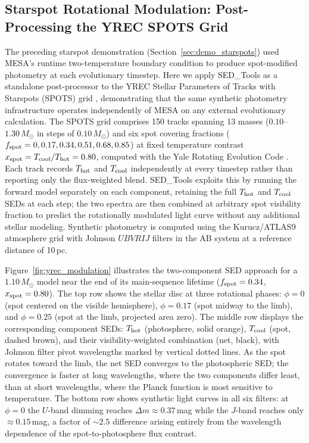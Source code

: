 \documentclass[linenumbers,apj,twocolumn, floatfix]{aastex701} \usepackage{amsmath} \usepackage{longtable} \usepackage{graphicx} \usepackage{ulem} \usepackage{xcolor} \usepackage{lettrine} \usepackage{yfonts} \usepackage{rotating}
\begin{document}
\subsection{Starspot Rotational Modulation: Post-Processing the YREC SPOTS Grid}
\label{sec:demo_yrec}

The preceding starspot demonstration (Section~\ref{sec:demo_starspots}) used MESA's runtime two-temperature boundary condition to produce spot-modified photometry at each evolutionary timestep.
Here we apply SED\_Tools as a standalone post-processor to the YREC Stellar Parameters of Tracks with Starspots (SPOTS) grid \citep{Somers2020}, demonstrating that the same synthetic photometry infrastructure operates independently of MESA on any external evolutionary calculation.
The SPOTS grid comprises 150 tracks spanning 13 masses ($0.10$--$1.30\,M_\odot$ in steps of $0.10\,M_\odot$) and six spot covering fractions ($f_{\rm spot} = 0, 0.17, 0.34, 0.51, 0.68, 0.85$) at fixed temperature contrast $x_{\rm spot} = T_{\rm cool}/T_{\rm hot} = 0.80$, computed with the Yale Rotating Evolution Code \citep{vanSaders2013}.
Each track records $T_{\rm hot}$ and $T_{\rm cool}$ independently at every timestep rather than reporting only the flux-weighted blend.
SED\_Tools exploits this by running the forward model separately on each component, retaining the full $T_{\rm hot}$ and $T_{\rm cool}$ SEDs at each step; the two spectra are then combined at arbitrary spot visibility fraction to predict the rotationally modulated light curve without any additional stellar modeling.
Synthetic photometry is computed using the Kurucz/ATLAS9 atmosphere grid with Johnson $UBVRIJ$ filters in the AB system at a reference distance of 10\,pc.

Figure~\ref{fig:yrec_modulation} illustrates the two-component SED approach for a $1.10\,M_\odot$ model near the end of its main-sequence lifetime ($f_{\rm spot} = 0.34$, $x_{\rm spot} = 0.80$).
The top row shows the stellar disc at three rotational phases: $\phi = 0$ (spot centered on the visible hemisphere), $\phi = 0.17$ (spot midway to the limb), and $\phi = 0.25$ (spot at the limb, projected area zero).
The middle row displays the corresponding component SEDs: $T_{\rm hot}$ (photosphere, solid orange), $T_{\rm cool}$ (spot, dashed brown), and their visibility-weighted combination (net, black), with Johnson filter pivot wavelengths marked by vertical dotted lines.
As the spot rotates toward the limb, the net SED converges to the photospheric SED; the convergence is faster at long wavelengths, where the two components differ least, than at short wavelengths, where the Planck function is most sensitive to temperature.
The bottom row shows synthetic light curves in all six filters: at $\phi = 0$ the $U$-band dimming reaches $\Delta m \approx 0.37$\,mag while the $J$-band reaches only $\approx 0.15$\,mag, a factor of $\sim 2.5$ difference arising entirely from the wavelength dependence of the spot-to-photosphere flux contrast.
\end{document}
